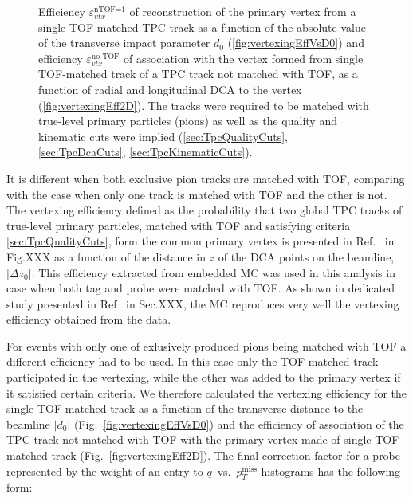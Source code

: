\begin{figure}[b!]
{\begin{subfigure}[b]{\linewidth}
  \end{subfigure}
}%
\caption[Efficiencies for reconstruction of the vertex with single TOF-matched TPC track and association with this vertex of TOF-unmatched track.]%
    {Efficiency $\varepsilon_{vtx}^{\text{nTOF=1}}$ of reconstruction of the primary vertex from a single TOF-matched TPC track as a function of the absolute value of the transverse impact parameter $d_{0}$ (\ref{fig:vertexingEffVsD0}) and efficiency $\varepsilon_{vtx}^{\text{no-TOF}}$ of association with the vertex formed from single TOF-matched track of a TPC track not matched with TOF, as a function of radial and longitudinal DCA to the vertex (\ref{fig:vertexingEff2D}). The tracks were required to be matched with true-level primary particles (pions) as well as the quality and kinematic cuts were implied (\ref{sec:TpcQualityCuts}, \ref{sec:TpcDcaCuts}, \ref{sec:TpcKinematicCuts}).}\label{fig:vertexingEffTagAndProbe}%
\end{figure}
%
%
It is different when both exclusive pion tracks are matched with TOF, comparing with the case when only one track is matched with TOF and the other is not. The vertexing efficiency defined as the probability that two global TPC tracks of true-level primary particles, matched with TOF and satisfying criteria \ref{sec:TpcQualityCuts}, form the common primary vertex is presented in Ref.~\cite{AnalysisNoteRafal} in Fig.XXX as a function of the distance in $z$ of the DCA points on the beamline, $|\Delta z_{0}|$. This efficiency extracted from embedded MC was used in this analysis in case when both tag and probe were matched with TOF. As shown in dedicated study presented in Ref~\cite{AnalysisNoteRafal} in Sec.XXX, the MC reproduces very well the vertexing efficiency obtained from the data.

For events with only one of exlusively produced pions being matched with TOF a different efficiency had to be used. In this case only the TOF-matched track participated in the vertexing, while the other was added to the primary vertex if it satisfied certain criteria. We therefore calculated the vertexing efficiency for the single TOF-matched track as a function of the transverse distance to the beamline $|d_{0}|$ (Fig.~\ref{fig:vertexingEffVsD0}) and the efficiency of association of the TPC track not matched with TOF with the primary vertex made of single TOF-matched track (Fig.~\ref{fig:vertexingEff2D}). The final correction factor for a probe represented by the weight of an entry to $q$~vs.~$p_{T}^{\text{miss}}$ histograms has the following form:

